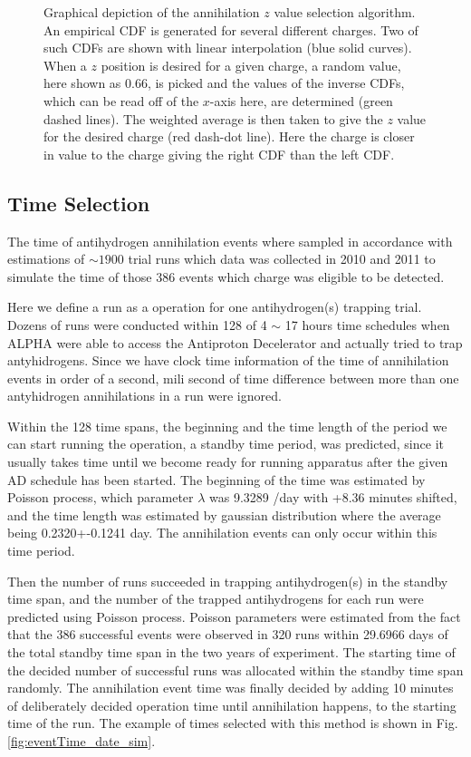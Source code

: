 \documentclass[superscriptaddress,aps,prb,11pt]{revtex4-1}
\begin{document}
\begin{figure}
  \caption{Graphical depiction of the annihilation $z$ value selection algorithm.  An empirical CDF is generated for several different charges.  Two of such CDFs are shown with linear interpolation (blue solid curves).  When a $z$ position is desired for a given charge, a random value, here shown as 0.66, is picked and the values of the inverse CDFs, which can be read off of the $x$-axis here, are determined (green dashed lines).  The weighted average is then taken to give the $z$ value for the desired charge (red dash-dot line).  Here the charge is closer in value to the charge giving the right CDF than the left CDF.}
  \label{fig:z_interpolation}
\end{figure}

\subsection*{Time Selection}
 The time of antihydrogen annihilation events where sampled in accordance with estimations of $\sim 1900$  trial runs which data was collected in 2010 and 2011 to simulate the time of those 386 events which charge was eligible to be detected.
 
 Here we define a run as a operation for one antihydrogen(s) trapping trial. Dozens of runs were conducted within 128 of 4 $\sim$ 17 hours time schedules when ALPHA were able to access the Antiproton Decelerator and actually tried to trap antyhidrogens. Since we have clock time information of the time of annihilation events in order of a second, mili second of time difference between more than one antyhidrogen annihilations  in a run were ignored.
 
 Within the 128 time spans, the beginning and the time length of the period we can start running the operation, a standby time period, was predicted, since it usually takes time until we become ready for running apparatus after the given AD schedule has been started. The beginning of the time was estimated by Poisson process, which parameter $\lambda$ was 9.3289 /day  with +8.36 minutes shifted, and the time length was estimated by gaussian distribution where the average being 0.2320+-0.1241 day. The annihilation events can only occur within this time period. 
 
 Then the number of runs succeeded in trapping antihydrogen(s) in the standby time span, and the number of the trapped antihydrogens for each run were predicted using Poisson process. Poisson parameters were estimated from the fact that the 386 successful events were observed in 320 runs within 29.6966 days of the total standby time span in the two years of experiment. 
The starting time of the decided number of  successful runs was allocated within the standby time span randomly. The annihilation event time was finally decided by adding 10 minutes of deliberately decided operation time until annihilation happens, to the starting time of the run. The example of times selected with this method is shown in Fig.\ref{fig:eventTime_date_sim}.
 
\end{document}
